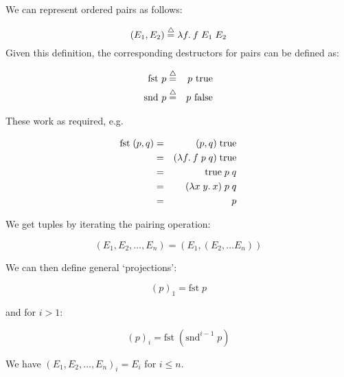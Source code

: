 \begin{slide*}


\vspace*{0.5cm}

We can represent ordered pairs as follows:

{\red $$ (E_1,E_2) \stackrel{\bigtriangleup}{=} \lambda f.\: f\; E_1\; E_2 $$}
Given this definition, the corresponding destructors for pairs can be
defined as:

\begin{red}
\begin{eqnarray*}
\mbox{fst } p & \stackrel{\bigtriangleup}{=} & p \mbox{ true}                                 \\
\mbox{snd } p & \stackrel{\bigtriangleup}{=} & p \mbox{ false}
\end{eqnarray*}
\end{red}
These work as required, e.g.
\begin{red}
\begin{eqnarray*}
\mbox{fst}\; (p,q) & = & (p,q)\; \mbox{true}                            \\
                   & = & (\lambda f.\: f\; p\; q)\; \mbox{true}             \\
                   & = & \mbox{true}\; p\; q                            \\
                   & = & (\lambda x\; y.\: x)\; p\; q                       \\
                   & = & p
\end{eqnarray*}
\end{red}

\end{slide*}



\begin{slide*}


\vspace*{0.5cm}

We get tuples by iterating the pairing operation:

{\red $$ (E_1,E_2,\ldots,E_n) = (E_1,(E_2,\ldots E_n)) $$}

We can then define general `projections':

{\red $$ (p)_1 = \mbox{fst}\; p $$}

and for {\red $i > 1$}:

{\red $$ (p)_i = \mbox{fst}\; (\mbox{snd}^{i-1}\; p) $$}

We have {\red $(E_1,E_2,\ldots,E_n)_i = E_i$} for {\red $i \leq n$}.

\end{slide*}


